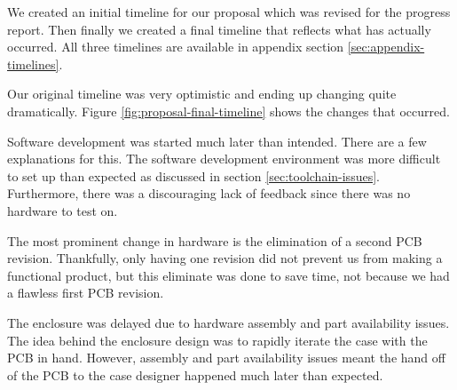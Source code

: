We created an initial timeline for our proposal which was revised for the
progress report.  Then finally we created a final timeline that reflects what
has actually occurred.  All three timelines are available in appendix
section \ref{sec:appendix-timelines}.

Our original timeline was very optimistic and ending up changing quite
dramatically.  Figure \ref{fig:proposal-final-timeline} shows the changes that
occurred.

Software development was started much later than intended. There are a few
explanations for this.  The software development environment was more difficult
to set up than expected as discussed in section \ref{sec:toolchain-issues}.
Furthermore, there was a discouraging lack of feedback since there was no
hardware to test on.

The most prominent change in hardware is the elimination of a second PCB
revision. Thankfully, only having one revision did not prevent us from making a
functional product, but this eliminate was done to save time, not because we
had a flawless first PCB revision.

The enclosure was delayed due to hardware assembly and part availability
issues.  The idea behind the enclosure design was to rapidly iterate the case
with the PCB in hand.  However, assembly and part availability issues meant the
hand off of the PCB to the case designer happened much later than expected.



\newcommand\mygantttitle {
    \gantttitlecalendar{year} \\
    \gantttitlecalendar{month} \\
    \gantttitlecalendar{week}
}

